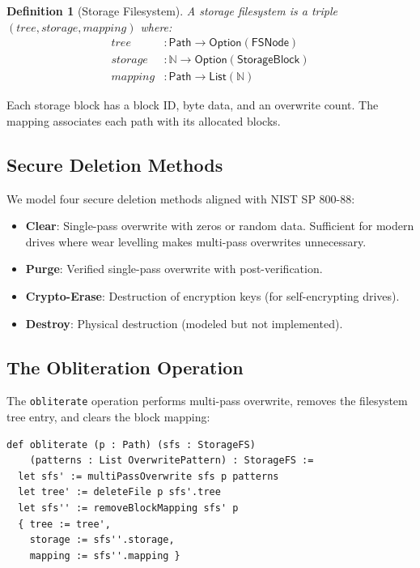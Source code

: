 \documentclass[11pt,a4paper]{article}
\newtheorem{definition}[theorem]{Definition}
\begin{document}
\begin{definition}[Storage Filesystem]
\label{def:storagefs}
A \emph{storage filesystem} is a triple $(\mathit{tree}, \mathit{storage},
\mathit{mapping})$ where:
\begin{align*}
  \mathit{tree}    &: \mathsf{Path} \to \mathsf{Option}(\mathsf{FSNode}) \\
  \mathit{storage} &: \mathbb{N} \to \mathsf{Option}(\mathsf{StorageBlock}) \\
  \mathit{mapping} &: \mathsf{Path} \to \mathsf{List}(\mathbb{N})
\end{align*}
\end{definition}

Each storage block has a block ID, byte data, and an overwrite count. The
mapping associates each path with its allocated blocks.

\subsection{Secure Deletion Methods}

We model four secure deletion methods aligned with NIST SP 800-88:

\begin{itemize}
  \item \textbf{Clear}: Single-pass overwrite with zeros or random data.
        Sufficient for modern drives where wear levelling makes multi-pass
        overwrites unnecessary.
  \item \textbf{Purge}: Verified single-pass overwrite with post-verification.
  \item \textbf{Crypto-Erase}: Destruction of encryption keys (for
        self-encrypting drives).
  \item \textbf{Destroy}: Physical destruction (modeled but not implemented).
\end{itemize}

\subsection{The Obliteration Operation}

The \texttt{obliterate} operation performs multi-pass overwrite, removes the
filesystem tree entry, and clears the block mapping:

\begin{lstlisting}[style=leanstyle,caption={The obliterate operation in Lean 4.}]
def obliterate (p : Path) (sfs : StorageFS)
    (patterns : List OverwritePattern) : StorageFS :=
  let sfs' := multiPassOverwrite sfs p patterns
  let tree' := deleteFile p sfs'.tree
  let sfs'' := removeBlockMapping sfs' p
  { tree := tree',
    storage := sfs''.storage,
    mapping := sfs''.mapping }
\end{lstlisting}
\end{document}
